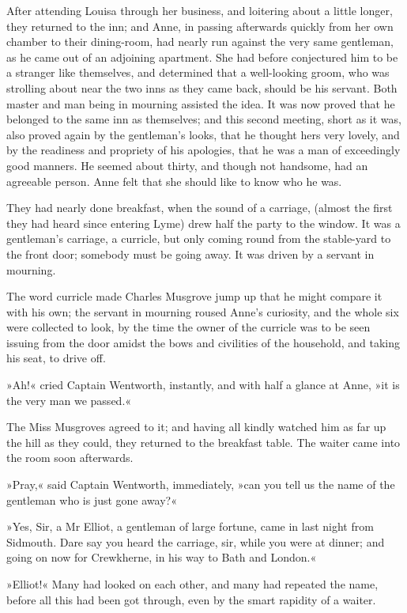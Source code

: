 After attending Louisa through her business, and loitering about a little longer, they returned to the inn; and Anne, in passing afterwards quickly from her own chamber to their dining-room, had nearly run against the very same gentleman, as he came out of an adjoining apartment. She had before conjectured him to be a stranger like themselves, and determined that a well-looking groom, who was strolling about near the two inns as they came back, should be his servant. Both master and man being in mourning assisted the idea. It was now proved that he belonged to the same inn as themselves; and this second meeting, short as it was, also proved again by the gentleman's looks, that he thought hers very lovely, and by the readiness and propriety of his apologies, that he was a man of exceedingly good manners. He seemed about thirty, and though not handsome, had an agreeable person. Anne felt that she should like to know who he was.

They had nearly done breakfast, when the sound of a carriage, (almost the first they had heard since entering Lyme) drew half the party to the window. It was a gentleman's carriage, a curricle, but only coming round from the stable-yard to the front door; somebody must be going away. It was driven by a servant in mourning.

The word curricle made Charles Musgrove jump up that he might compare it with his own; the servant in mourning roused Anne's curiosity, and the whole six were collected to look, by the time the owner of the curricle was to be seen issuing from the door amidst the bows and civilities of the household, and taking his seat, to drive off.

»Ah!« cried Captain Wentworth, instantly, and with half a glance at Anne, »it is the very man we passed.«

The Miss Musgroves agreed to it; and having all kindly watched him as far up the hill as they could, they returned to the breakfast table. The waiter came into the room soon afterwards.

»Pray,« said Captain Wentworth, immediately, »can you tell us the name of the gentleman who is just gone away?«

»Yes, Sir, a Mr Elliot, a gentleman of large fortune, came in last night from Sidmouth. Dare say you heard the carriage, sir, while you were at dinner; and going on now for Crewkherne, in his way to Bath and London.«

»Elliot!« Many had looked on each other, and many had repeated the name, before all this had been got through, even by the smart rapidity of a waiter.

